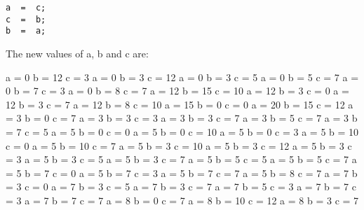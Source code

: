 \documentclass[10pt]{exam}
\begin{document}
\begin{questions}
\begin{minipage}[t][][t]{0.18\textwidth}
\begin{lstlisting}
a  =  c;
c  =  b;
b  =  a;
  \end{lstlisting}
\end{minipage}
  \hfill
\begin{minipage}[t][][t]{0.75\textwidth}
  The new values of a, b and c are:
  \begin{multicols*}{3}
\begin{checkboxes}
    \choice a = 0 b = 12 c = 3
    \choice a = 0 b = 3 c = 12
    \choice a = 0 b = 3 c = 5
    \choice a = 0 b = 5 c = 7
    \choice a = 0 b = 7 c = 3
    \choice a = 0 b = 8 c = 7
    \choice a = 12 b = 15 c = 10
    \choice a = 12 b = 3 c = 0
    \choice a = 12 b = 3 c = 7
    \choice a = 12 b = 8 c = 10
    \choice a = 15 b = 0 c = 0
    \choice a = 20 b = 15 c = 12
    \choice a = 3 b = 0 c = 7
    \choice a = 3 b = 3 c = 3
    \choice a = 3 b = 3 c = 7
    \choice a = 3 b = 5 c = 7
    \choice a = 3 b = 7 c = 5
    \choice a = 5 b = 0 c = 0
    \choice a = 5 b = 0 c = 10
    \choice a = 5 b = 0 c = 3
    \choice a = 5 b = 10 c = 0
    \choice a = 5 b = 10 c = 7
    \choice a = 5 b = 3 c = 10
    \choice a = 5 b = 3 c = 12
    \choice a = 5 b = 3 c = 3
    \choice a = 5 b = 3 c = 5
    \choice a = 5 b = 3 c = 7
    \choice a = 5 b = 5 c = 5
    \choice a = 5 b = 5 c = 7
    \choice a = 5 b = 7 c = 0
    \choice a = 5 b = 7 c = 3
    \choice a = 5 b = 7 c = 7
    \choice a = 5 b = 8 c = 7
    \choice a = 7 b = 3 c = 0
    \choice a = 7 b = 3 c = 5
    \choice a = 7 b = 3 c = 7
    \choice a = 7 b = 5 c = 3
    \choice a = 7 b = 7 c = 3
    \choice a = 7 b = 7 c = 7
    \choice a = 8 b = 0 c = 7
    \choice a = 8 b = 10 c = 12
    \choice a = 8 b = 3 c = 7
  \end{checkboxes}
\end{multicols*}
\end{minipage}
\end{questions}
\end{document}
